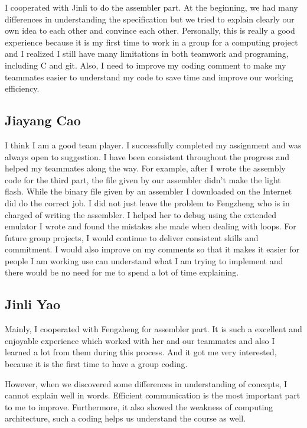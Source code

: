\documentclass[11pt]{article}
\begin{document}
\noindent
I cooperated with Jinli to do the assembler part. At the beginning, we had many differences in understanding the specification but we tried to explain clearly our own idea to each other and convince each other. Personally, this is really a good experience because it is my first time to work in a group for a computing project and I realized I still have many limitations in both teamwork and programing, including C and git. Also, I need to improve my coding comment to make my teammates easier to understand my code to save time and improve our working efficiency.

\subsection{Jiayang Cao}
I think I am a good team player. I successfully completed my assignment and was always open to suggestion. I have been consistent throughout the progress and helped my teammates along the way. For example, after I wrote the assembly code for the third part, the file given by our assembler didn’t make the light flash. While the binary file given by an assembler I downloaded on the Internet did do the correct job. I did not just leave the problem to Fengzheng who is in charged of writing the assembler. I helped her to debug using the extended emulator I wrote and found the mistakes she made when dealing with loops. For future group projects, I would continue to deliver consistent skills and commitment. I would also improve on my comments so that it makes it easier for people I am working use can understand what I am trying to implement and there would be no need for me to spend a lot of time explaining. 


\subsection{Jinli Yao}
Mainly, I cooperated with Fengzheng for assembler part. It is such a excellent and enjoyable experience which worked with her and our teammates and also I learned a lot from them during this process. And it got me very interested, because it is the first time to have a group coding. \newline 

\noindent
However, when we discovered some differences in understanding  of concepts, I cannot explain well in words. Efficient communication is the most important part to me to improve. Furthermore, it also showed the weakness of computing architecture, such a coding helps us understand the course as well.
\newline 
\end{document}
